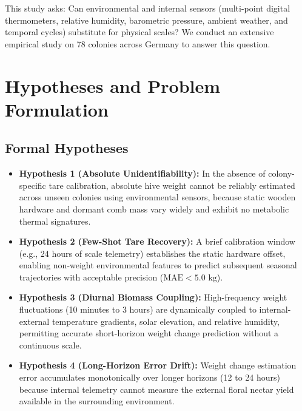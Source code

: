 \documentclass[10pt,twocolumn]{article}
\begin{document}
This study asks: Can environmental and internal sensors (multi-point digital thermometers, relative humidity, barometric pressure, ambient weather, and temporal cycles) substitute for physical scales? We conduct an extensive empirical study on 78 colonies across Germany to answer this question.

\section{Hypotheses and Problem Formulation}
\subsection{Formal Hypotheses}
\begin{itemize}
    \item \textbf{Hypothesis 1 (Absolute Unidentifiability):} In the absence of colony-specific tare calibration, absolute hive weight cannot be reliably estimated across unseen colonies using environmental sensors, because static wooden hardware and dormant comb mass vary widely and exhibit no metabolic thermal signatures.
    \item \textbf{Hypothesis 2 (Few-Shot Tare Recovery):} A brief calibration window (e.g., 24 hours of scale telemetry) establishes the static hardware offset, enabling non-weight environmental features to predict subsequent seasonal trajectories with acceptable precision ($\text{MAE} < 5.0\text{ kg}$).
    \item \textbf{Hypothesis 3 (Diurnal Biomass Coupling):} High-frequency weight fluctuations (10 minutes to 3 hours) are dynamically coupled to internal-external temperature gradients, solar elevation, and relative humidity, permitting accurate short-horizon weight change prediction without a continuous scale.
    \item \textbf{Hypothesis 4 (Long-Horizon Error Drift):} Weight change estimation error accumulates monotonically over longer horizons (12 to 24 hours) because internal telemetry cannot measure the external floral nectar yield available in the surrounding environment.
\end{itemize}
\end{document}
